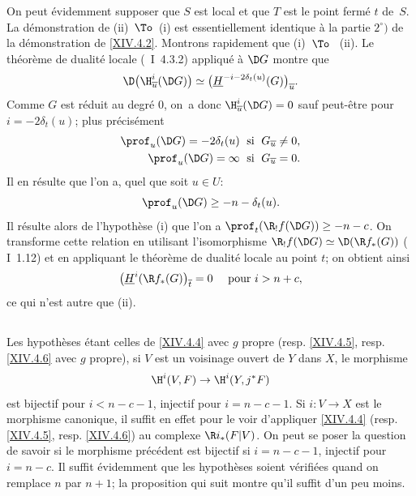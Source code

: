 On peut \'evidemment supposer que $S$ est local et que $T$ est le point ferm\'e $t$ de~$S$. La d\'emonstration de \textup{(ii)}~$\To$~\textup{(i)} est essentiellement identique \`a la partie $2^\circ)$ de la d\'emonstration de \ref{XIV.4.2}. Montrons rapidement que \textup{(i)}~$\To$~ \textup{(ii)}. Le th\'eor\`eme de dualit\'e locale (~I~4.3.2) appliqu\'e \`a $\D G$ montre que
$$
\D\big(\H_{\overline{u}}^{i}(\D G)\big) \simeq\big(\underline{H}^{-i-2\delta_{t}(u)}(G)\big)_{\overline{u}}.
$$
Comme $G$ est r\'eduit au degr\'e $0$, on~a donc $\H_{\overline{u}}^{i}(\D G)=0$ sauf peut-\^etre pour $i=-2\delta_{t}(u)$; plus pr\'ecis\'ement
\begin{align*}
\prof_{u}(\D G)=-2\delta_{t}(u) &\;\textrm{ si }\; G_{\overline{u}}\neq 0, \\
\prof_{u}(\D G)=\infty &\;\textrm{ si }\; G_{\overline{u}}=0.
\end{align*}
Il en r\'esulte que l'on a, quel que soit $u\in U$:
$$
\prof_{u}(\D G)\geq -n-\delta_{t}(u).
$$
Il r\'esulte alors de l'hypoth\`ese \textup{(i)} que l'on a $\prof_{t}(\R_{!}f(\D G))\geq -n-c$. On transforme cette relation en utilisant l'isomorphisme $\R_{!}f(\D G)\simeq\D(\R f_{\ast}(G))$ ( I~1.12) et en appliquant le th\'eor\`eme de dualit\'e locale au point $t$; on obtient ainsi
$$
\big(\underline{H}^{i}(\R f_{\ast}(G)\big)_{\overline{t}}=0\quad\textrm{ pour }i>n+c,
$$
ce qui n'est autre que \textup{(ii)}.

\subsection{} \label{XIV.4.8} Les hypoth\`eses \'etant celles de \ref{XIV.4.4} avec $g$ propre (resp. \ref{XIV.4.5}, resp. \ref{XIV.4.6} avec $g$ propre), si $V$ est un voisinage ouvert de $Y$ dans $X$, le morphisme
$$
\H^{i}(V, F)\to\H^{i}(Y, j^{\ast}F)$$
est bijectif pour $i<n-c-1$, injectif pour $i=n-c-1$. Si $i\colon V\to X$ est le morphisme canonique, il suffit en effet pour le voir d'appliquer \ref{XIV.4.4} (resp. \ref{XIV.4.5}, resp. \ref{XIV.4.6}) au complexe $\R i_{\ast}(F{|V})$. On peut se poser la question de savoir si le morphisme pr\'ec\'edent est bijectif si $i=n-c-1$, injectif pour $i=n-c$. Il suffit \'evidemment que les hypoth\`eses soient v\'erifi\'ees quand on remplace $n$ par $n+1$; la proposition qui suit montre qu'il suffit d'un peu moins.

